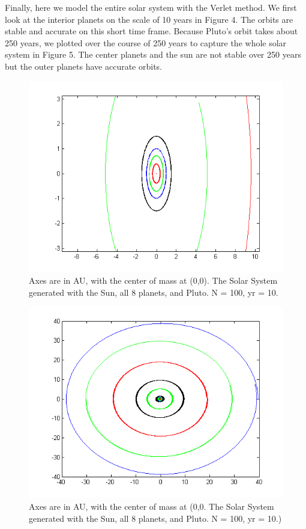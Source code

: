 \documentclass[11pt]{article}
\begin{document}
Finally, here we model the entire solar system with the Verlet method. We first look at the interior planets on the scale of 10 years in Figure 4. The orbits are stable and accurate on this short time frame. Because Pluto's orbit takes about 250 years, we plotted over the course of 250 years to capture the whole solar system in Figure 5. The center planets and the sun are not stable over 250 years but the outer planets have accurate orbits.

\begin{figure}
	\includegraphics[width=\linewidth]{n100yr10}
	\caption{Axes are in AU, with the center of mass at (0,0). The Solar System generated with the Sun, all 8 planets, and Pluto. N = 100, yr = 10.}
\end{figure}

\begin{figure}
	\includegraphics[width=\linewidth]{n200yr250}
	\caption{Axes are in AU, with the center of mass at (0,0.  The Solar System generated with the Sun, all 8 planets, and Pluto. N = 100, yr = 10.)}
\end{figure}
\end{document}
